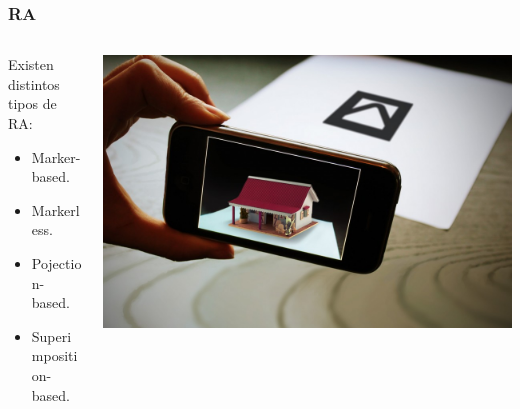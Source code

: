 \begin{frame}
	\frametitle{RA}
	\begin{columns}
			\begin{column}{0.45\textwidth}
					Existen distintos tipos de RA:
					\begin{itemize}
						\item {Marker-based.}
						\item {Markerless.}
						\item {Pojection-based.}
						\item {Superimposition-based.}
					\end{itemize}
				\endblock{}
			\end{column}
			\begin{column}{0.55\textwidth}
				\vfill 
					\begin{center}
						\includegraphics[width=0.95\linewidth]{Images/marker-ar}
					\end{center}
			\end{column}
	\end{columns}
\end{frame}


